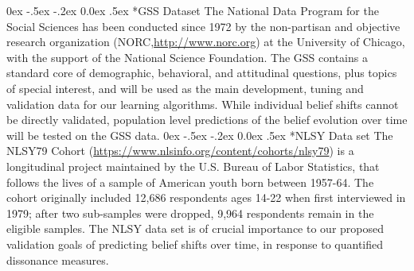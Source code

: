 \documentclass[onecolumn, compsoc,11pt]{IEEEtran}
\makeatletter
\renewcommand\subsubsection{\@startsection {section}{1}{\z@}%
                                   {0ex \@plus -.5ex \@minus -.2ex}%
                                   {0.0ex \@plus.5ex}%
                                   {\fontsize{10}{10}\selectfont\bfseries\sffamily\color{Red4}}}
\makeatother
\begin{document}
\subsubsection*{GSS Dataset} The National Data Program for the Social Sciences has been conducted since 1972 by the non-partisan and objective research organization (NORC,\href{http://www.norc.org}{http://www.norc.org}) at the University of Chicago,  with the support of the National Science Foundation. %
The GSS contains a standard core of demographic, behavioral, and attitudinal questions, plus topics of special interest, and will be used as the main development, tuning and validation data for our learning algorithms. While individual belief shifts cannot be directly validated, population level predictions of the belief evolution over time will be tested on the GSS data.
%
\subsubsection*{NLSY Data set} The NLSY79 Cohort (\href{https://www.nlsinfo.org/content/cohorts/nlsy79}{https://www.nlsinfo.org/content/cohorts/nlsy79}) is a longitudinal project maintained by the U.S. Bureau of Labor Statistics, that follows the lives of a sample of American youth born between 1957-64. The cohort originally included 12,686 respondents ages 14-22 when first interviewed in 1979; after two sub-samples were dropped, 9,964 respondents remain in the eligible samples. %
The NLSY data set is of crucial importance to our proposed validation goals of predicting belief shifts over time, in response to quantified dissonance measures.
\end{document}
